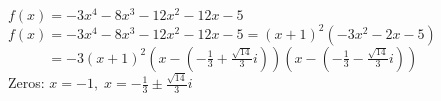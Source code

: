 {$f(x) = -3x^4-8x^3-12x^2-12x-5$}
{$f(x) = -3x^4-8x^3-12x^2-12x-5 = (x+1)^2 \left(-3x^2-2x-5\right)$ \\
$\phantom{f(x)}= -3(x+1)^2\left(x - \left( -\frac{1}{3}+\frac{\sqrt{14}}{3} i\right) \right) \left(x - \left( -\frac{1}{3}-\frac{\sqrt{14}}{3} i\right) \right)$ \\
Zeros:  $x = -1, \; x = -\frac{1}{3} \pm \frac{\sqrt{14}}{3} i$}